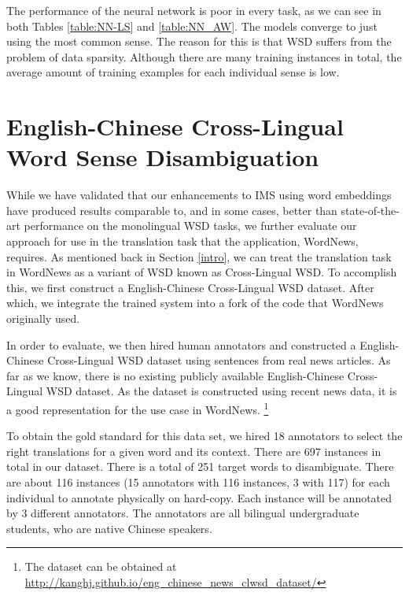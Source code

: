 \documentclass[11pt]{article}
\begin{document}
The performance of the neural network is poor in every task, as we can see in both Tables \ref{table:NN-LS} and \ref{table:NN_AW}. The models converge to just using the most common sense. The reason for this is that WSD suffers from the problem of data sparsity. Although there are many training instances in total, the average amount of training examples for each individual sense is low. 


\section{English-Chinese Cross-Lingual Word Sense Disambiguation}
\label{section:CLWSD}



While we have validated that our enhancements to IMS using word embeddings have produced results comparable to, and in some cases, better than state-of-the-art performance on the monolingual WSD tasks, we further evaluate our approach for use in the translation task that the application, WordNews, requires. As mentioned back in Section \ref{intro}, we can treat the translation task in WordNews as a variant of WSD known as Cross-Lingual WSD. To accomplish this, we first construct a English-Chinese Cross-Lingual WSD dataset. After which, we integrate the trained system into a fork of the code that WordNews originally used. 

In order to evaluate, we then hired human annotators and constructed a English-Chinese Cross-Lingual WSD dataset using sentences from real news articles. As far as we know, there is no existing publicly available English-Chinese Cross-Lingual WSD dataset. As the dataset is constructed using recent news data, it is a good representation for the use case in WordNews. {\footnote{The dataset can be obtained at {\url{  http://kanghj.github.io/eng_chinese_news_clwsd_dataset/}}}}

To obtain the gold standard for this data set, we hired 18 annotators to select the right translations for a given word and its context. There are 697 instances in total in our dataset. There is a total of 251 target words to disambiguate. There are about 116 instances (15 annotators with 116 instances, 3 with 117) for each individual to annotate physically on hard-copy. Each instance will be annotated by 3 different annotators. The annotators are all bilingual undergraduate students, who are native Chinese speakers. 
\end{document}
